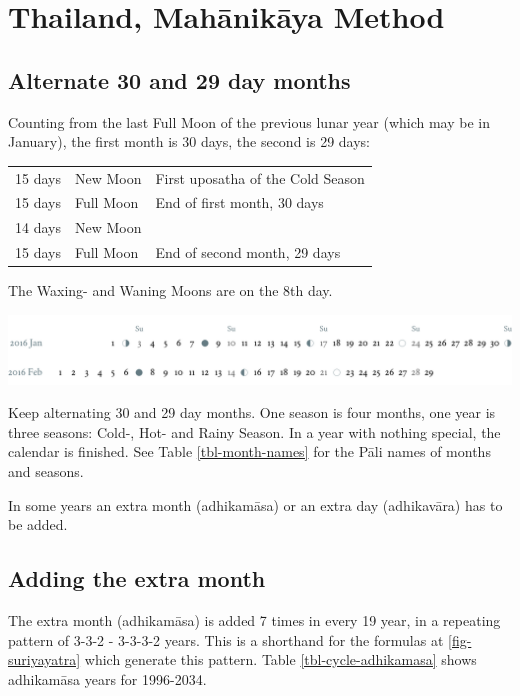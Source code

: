 \documentclass[11pt,oneside]{memoir-article}
\begin{document}
\clearpage

\chapter{Thailand, Mahānikāya Method}
\label{sec-1}
\section{Alternate 30 and 29 day months}
\label{sec-1-1}

Counting from the last Full Moon of the previous lunar year (which may
be in January), the first month is 30 days, the second is 29 days:

\begin{center}
\begin{tabular}{lll}
15 days & \GaNewmoon{} New Moon & First uposatha of the Cold Season\\
15 days & \GaFullmoon{} Full Moon & End of first month, 30 days\\
14 days & \GaNewmoon{} New Moon & \\
15 days & \GaFullmoon{} Full Moon & End of second month, 29 days\\
\end{tabular}
\end{center}

The \GaWaxingmoon{} Waxing- and \GaWaningmoon{} Waning Moons are on the 8th day.

\includegraphics[width=\linewidth]{two-months.pdf}

Keep alternating 30 and 29 day months. One season is four months, one
year is three seasons: Cold-, Hot- and Rainy Season. In a year with
nothing special, the calendar is finished. See Table \ref{tbl-month-names}
for the Pāli names of months and seasons.

In some years an extra month (adhikamāsa) or an extra day
(adhikavāra) has to be added.

\section{Adding the extra month}
\label{sec-1-2}

The extra month (adhikamāsa) is added 7 times in every 19 year, in a repeating
pattern of 3-3-2 - 3-3-3-2 years. This is a shorthand for the formulas
at \ref{fig-suriyayatra} which generate this pattern. Table
\ref{tbl-cycle-adhikamasa} shows adhikamāsa years for 1996-2034.
\end{document}
